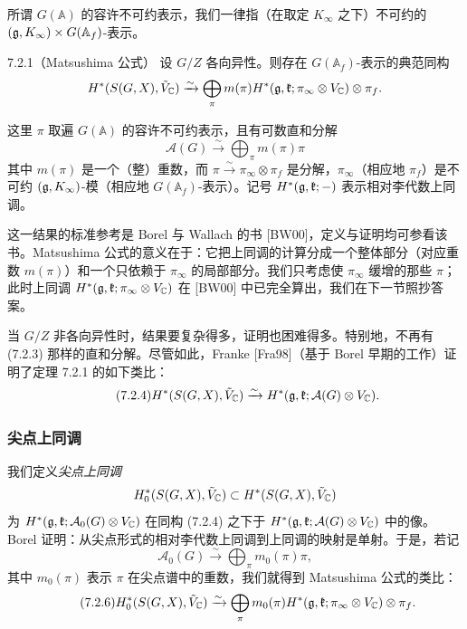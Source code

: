 所谓 $G(\mathbb{A})$ 的容许不可约表示，我们一律指（在取定 $K_\infty$ 之下）不可约的 $(\mathfrak{g},K_\infty)\times G(\mathbb{A}_f)$-表示。

\begin{thm}{7.2.1}（Matsushima 公式）\label{thm:a6-04-13}
设 $G/Z$ 各向异性。则存在 $G(\mathbb{A}_f)$-表示的典范同构
\[
H^*(S(G,X),\tilde V_{\mathbb{C}})\xrightarrow{\sim}\bigoplus_\pi m(\pi)H^*(\mathfrak{g},\mathfrak{k};\pi_\infty\otimes V_{\mathbb{C}})\otimes\pi_f.
\]
\end{thm}

这里 $\pi$ 取遍 $G(\mathbb{A})$ 的容许不可约表示，且有可数直和分解
\begin{equation}\tag{7.2.3}\label{eq:a6-04-13}
\mathcal A(G)\xrightarrow{\sim}\bigoplus_\pi m(\pi)\pi
\end{equation}
其中 $m(\pi)$ 是一个（整）重数，而 $\pi\xrightarrow{\sim}\pi_\infty\otimes\pi_f$ 是分解，$\pi_\infty$（相应地 $\pi_f$）是不可约 $(\mathfrak{g},K_\infty)$-模（相应地 $G(\mathbb{A}_f)$-表示）。记号 $H^*(\mathfrak{g},\mathfrak{k};-)$ 表示相对李代数上同调。

这一结果的标准参考是 Borel 与 Wallach 的书 [BW00]，定义与证明均可参看该书。Matsushima 公式的意义在于：它把上同调的计算分成一个整体部分（对应重数 $m(\pi)$）和一个只依赖于 $\pi_\infty$ 的局部部分。我们只考虑使 $\pi_\infty$ 缓增的那些 $\pi$；此时上同调 $H^*(\mathfrak{g},\mathfrak{k};\pi_\infty\otimes V_{\mathbb{C}})$ 在 [BW00] 中已完全算出，我们在下一节照抄答案。

当 $G/Z$ 非各向异性时，结果要复杂得多，证明也困难得多。特别地，不再有 (7.2.3) 那样的直和分解。尽管如此，Franke [Fra98]（基于 Borel 早期的工作）证明了定理 7.2.1 的如下类比：
\begin{equation}\tag{7.2.4}\label{eq:a6-04-14}
H^*(S(G,X),\tilde V_{\mathbb{C}})\xrightarrow{\sim}H^*(\mathfrak{g},\mathfrak{k};\mathcal A(G)\otimes V_{\mathbb{C}}).
\end{equation}


\subsubsection{尖点上同调}

我们定义\emph{尖点上同调}
\[
H^*_0(S(G,X),\tilde V_{\mathbb{C}})\subset H^*(S(G,X),\tilde V_{\mathbb{C}})
\]
为 $H^*(\mathfrak{g},\mathfrak{k};\mathcal A_0(G)\otimes V_{\mathbb{C}})$ 在同构 (7.2.4) 之下于 $H^*(\mathfrak{g},\mathfrak{k};\mathcal A(G)\otimes V_{\mathbb{C}})$ 中的像。Borel 证明：从尖点形式的相对李代数上同调到上同调的映射是单射。于是，若记
\begin{equation}\tag{7.2.5}\label{eq:a6-04-15}
\mathcal A_0(G)\xrightarrow{\sim}\bigoplus_\pi m_0(\pi)\pi,
\end{equation}
其中 $m_0(\pi)$ 表示 $\pi$ 在尖点谱中的重数，我们就得到 Matsushima 公式的类比：
\begin{equation}\tag{7.2.6}\label{eq:a6-04-16}
H^*_0(S(G,X),\tilde V_{\mathbb{C}})\xrightarrow{\sim}\bigoplus_\pi m_0(\pi)H^*(\mathfrak{g},\mathfrak{k};\pi_\infty\otimes V_{\mathbb{C}})\otimes\pi_f.
\end{equation}

